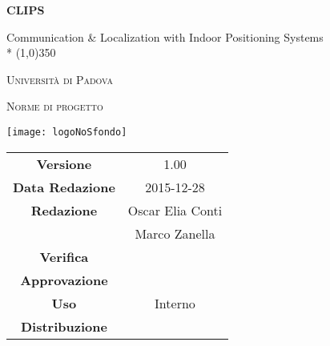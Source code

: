 \documentclass[a4paper,12pt]{article}
\author{Oscar Elia Conti, Marco Zanella}
\date{24/12/2015}
\begin{document}
	\begin{titlepage}
		\centering
		{\huge\bfseries CLIPS\par}
		Communication \& Localization with Indoor Positioning Systems \\*
		\line(1,0){350} \\
		{\scshape\LARGE Università di Padova \par}
		\vspace{1cm}
		{\scshape\Large Norme di progetto\par}
		\vspace{2cm}
		\begin{center}
		{\texttt{[image: logoNoSfondo]} \par}
		\end{center}
		\vfill \vfill
		\begin{tabular}{c|c}
			{\hfill \textbf{Versione}} 			& 1.00			\\
			{\hfill\textbf{Data Redazione}} 		& 2015-12-28  		\\ 
			{\hfill\textbf{Redazione}} 			&  Oscar Elia Conti  \\ 
											& Marco Zanella      \\
			{\hfill\textbf{Verifica}} 				&  \\ 
			{\hfill\textbf{Approvazione}} 		&  \\
			{\hfill\textbf{Uso}} 					& Interno			\\
			{\hfill\textbf{Distribuzione}} 			& \leaf			\\
		\end{tabular}
	\end{titlepage}
	\newpage
	
	\newpage
	\tableofcontents	
	\label{LastFrontPage}
	\newpage
	\pagestyle{mymain}
         
         	\newpage
		

	\newpage
		
	
	\newpage
		
	
	\newpage
		
		
	\label{LastPage}
\end{document}
